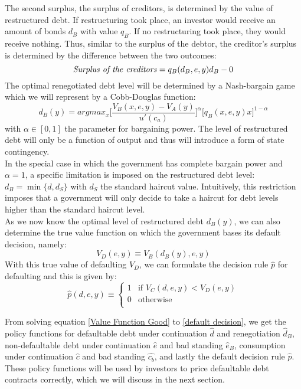 The second surplus, the surplus of creditors, is determined by the value of restructured debt. If restructuring took place, an investor would receive an amount of bonds $d_B$ with value $q_B$. If no restructuring took place, they would receive nothing. Thus, similar to the surplus of the debtor, the creditor's surplus is determined by the difference between the two outcomes:
\begin{equation*}
    \text{\textit{Surplus of the creditors}} = q_B(d_B,e,y)d_B - 0
\end{equation*}
The optimal renegotiated debt level will be determined by a Nash-bargain game which we will represent by a Cobb-Douglas function: 
\begin{equation}\label{reneg}
    d_B(y) = argmax_x \Bigg[\frac{V_B(x,e,y)-V_A(y)}{u'(c_a)}\Bigg]^\alpha\bigg[q_B(x,e,y)x\bigg]^{1-\alpha}
\end{equation}
with $\alpha \in [0,1]$ the parameter for bargaining power. The level of restructured debt will only be a function of output and thus will introduce a form of state contingency.\\

In the special case in which the government has complete bargain power and $\alpha = 1$, a specific limitation is imposed on the restructured debt level: $d_B = \min\{d, d_S\}$ with $d_S$ the standard haircut value. Intuitively, this restriction imposes that a government will only decide to take a haircut for debt levels higher than the standard haircut level.\\

As we now know the optimal level of restructured debt $d_B(y)$, we can also determine the true value function on which the government bases its default decision, namely:
\begin{equation}
    V_D(e,y) \equiv V_B(d_B(y),e,y)
\end{equation}
With this true value of defaulting $V_D$, we can formulate the decision rule $\hat{p}$ for defaulting and this is given by:
\begin{equation}\label{default decision}
    \hat{p}(d,e,y) \equiv 
    \begin{cases}
    1 & \text{if $V_C(d,e,y) < V_D(e,y)$}\\
    0 & \text{otherwise}\\
    \end{cases}
\end{equation}

From solving equation \eqref{Value Function Good} to \eqref{default decision}, we get the policy functions for defaultable debt under continuation $\hat{d}$ and renegotiation $\hat{d}_B$, non-defaultable debt under continuation $\hat{e}$ and bad standing $\hat{e}_B$, consumption under continuation $\hat{c}$ and bad standing $\hat{c_b}$, and lastly the default decision rule $\hat{p}$. These policy functions will be used by investors to price defaultable debt contracts correctly, which we will discuss in the next section.\\

